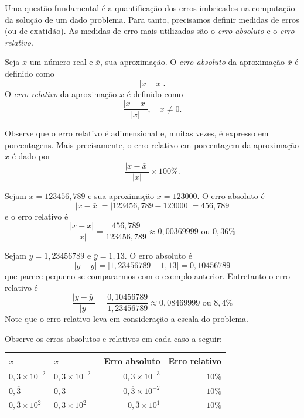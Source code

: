 Uma questão fundamental é a quantificação dos erros imbricados na computação da solução de um dado problema. Para tanto, precisamos definir medidas de erros (ou de exatidão). As medidas de erro mais utilizadas são o \emph{erro absoluto} e o \emph{erro relativo}.

\begin{defn} Seja $x$ um número real e $\overline{x}$, sua aproximação. O \emph{erro absoluto} da aproximação $\overline{x}$ é definido como
  \begin{equation}
    |x-\overline{x}|.
  \end{equation}
O \emph{erro relativo} da aproximação $\overline{x}$ é definido como
\begin{equation}
\frac{|x-\overline{x}|}{|x|},\quad x\neq 0.
\end{equation}
\end{defn}

\begin{obs}
  Observe que o erro relativo é adimensional e, muitas vezes, é expresso em porcentagens. Mais precisamente, o erro relativo em porcentagem da aproximação $\overline{x}$ é dado por
  \begin{equation}
    \frac{|x-\bar{x}|}{|x|}\times 100 \%.
  \end{equation}
\end{obs}

\begin{ex}
Sejam $x=123456,789$ e sua aproximação $\bar{x}=123000$. O erro absoluto é
$$
|x-\bar{x}|=|123456,789-123000|=456,789
$$
e o erro relativo é
$$
\frac{|x-\bar{x}|}{|x|}=\frac{456,789}{123456,789}\approx 0,00369999 \text{ ou }0,36\%
$$
\end{ex}

\begin{ex}
Sejam $y=1,23456789$ e $\bar{y}=1,13$. O erro absoluto é
$$
|y-\bar{y}|=|1,23456789-1,13|=0,10456789
$$
que parece pequeno se compararmos com o exemplo anterior. Entretanto o erro relativo é
$$
\frac{|y-\bar{y}|}{|y|}=\frac{0,10456789}{1,23456789}\approx 0,08469999 \text{ ou }8,4\%
$$
Note que o erro relativo leva em consideração a escala do problema.
\end{ex}



\begin{ex}
Observe os erros absolutos e relativos em cada caso a seguir:
\begin{center}
  \begin{tabular}{ll|rr} \hline
    $x$ & $\bar{x}$ &\ Erro absoluto & Erro relativo\\\hline
    $0,\overline{3}\times 10^{-2}$ & $0,3\times 10^{-2}$ & $0,\overline{3}\times 10^{-3}$ & $10\%$\\
    $0,\overline{3}$              & $0,3$ & $0,\overline{3}\times 10^{-2}$ & $10\%$\\
    $0,\overline{3}\times 10^{2}$ & $0,3\times 10^{2}$ & $0,\overline{3}\times 10^{1}$ & $10\%$\\\hline
\end{tabular}
\end{center}
\end{ex}

